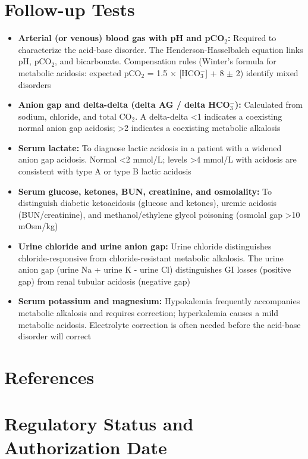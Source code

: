 \section*{Follow-up Tests}
\begin{itemize}
  \item \textbf{Arterial (or venous) blood gas with pH and pCO$_2$:} Required to characterize the acid-base disorder. The Henderson-Hasselbalch equation links pH, pCO$_2$, and bicarbonate. Compensation rules (Winter's formula for metabolic acidosis: expected pCO$_2$ = 1.5 $\times$ [HCO$_3^-$] + 8 $\pm$ 2) identify mixed disorders
  \item \textbf{Anion gap and delta-delta (delta AG / delta HCO$_3^-$):} Calculated from sodium, chloride, and total CO$_2$. A delta-delta <1 indicates a coexisting normal anion gap acidosis; >2 indicates a coexisting metabolic alkalosis
  \item \textbf{Serum lactate:} To diagnose lactic acidosis in a patient with a widened anion gap acidosis. Normal <2 mmol/L; levels >4 mmol/L with acidosis are consistent with type A or type B lactic acidosis
  \item \textbf{Serum glucose, ketones, BUN, creatinine, and osmolality:} To distinguish diabetic ketoacidosis (glucose and ketones), uremic acidosis (BUN/creatinine), and methanol/ethylene glycol poisoning (osmolal gap >10 mOsm/kg)
  \item \textbf{Urine chloride and urine anion gap:} Urine chloride distinguishes chloride-responsive from chloride-resistant metabolic alkalosis. The urine anion gap (urine Na + urine K - urine Cl) distinguishes GI losses (positive gap) from renal tubular acidosis (negative gap)
  \item \textbf{Serum potassium and magnesium:} Hypokalemia frequently accompanies metabolic alkalosis and requires correction; hyperkalemia causes a mild metabolic acidosis. Electrolyte correction is often needed before the acid-base disorder will correct
\end{itemize}

\section*{References}



\clearpage
\section*{Regulatory Status and Authorization Date}

\clearpage
